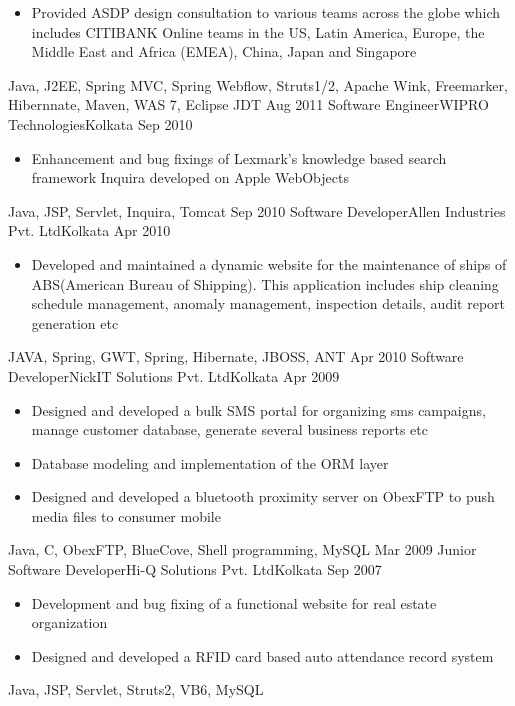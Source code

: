 \begin{experiences}
{\begin{itemize}
				\item Provided ASDP design consultation to various teams across the globe which includes CITIBANK Online teams in the US, Latin America, Europe, the Middle East and Africa (EMEA), China, Japan and Singapore
  				\end{itemize}
  }   
  {Java, J2EE, Spring MVC, Spring Webflow, Struts1/2, Apache Wink, Freemarker,
Hibernnate, Maven, WAS 7, Eclipse JDT}
 \emptySeparator   
  \experience
  {Aug 2011}    {Software Engineer}{WIPRO Technologies}{Kolkata}
  {Sep 2010}    {
                      \begin{itemize}
                        \item Enhancement and bug fixings of Lexmark’s knowledge based search framework Inquira developed on Apple WebObjects
                      \end{itemize}
                    }
                    {Java, JSP, Servlet, Inquira, Tomcat}    
  \emptySeparator            
  \experience
  {Sep 2010}   {Software Developer}{Allen Industries Pvt. Ltd}{Kolkata}
  {Apr 2010}   {
                      \begin{itemize}
                        \item Developed and maintained a dynamic website for the maintenance of ships of ABS(American Bureau of Shipping). This application includes ship cleaning schedule management, anomaly management, inspection details, audit report generation etc
                       \end{itemize}
                    }
                    {
                      JAVA, Spring, GWT, Spring, Hibernate, JBOSS, ANT
                    }
  \emptySeparator
  \experience
  {Apr 2010}  {Software Developer}{NickIT Solutions Pvt. Ltd}{Kolkata}
  {Apr 2009}   {
                      \begin{itemize}
                        \item Designed and developed a bulk SMS portal for organizing sms campaigns, manage customer database, generate several business reports etc
                        \item Database modeling and implementation of the ORM layer
                        \item Designed and developed a bluetooth proximity server on ObexFTP to push media files to consumer mobile
                      \end{itemize}
                  }
                  {Java, C, ObexFTP, BlueCove, Shell programming, MySQL}
 \emptySeparator
  \experience
  {Mar 2009}  {Junior Software Developer}{Hi-Q Solutions Pvt. Ltd}{Kolkata}
  {Sep 2007}   {
                      \begin{itemize}
                        \item Development and bug fixing of a functional website for real estate organization
                        \item Designed and developed a RFID card based auto attendance record system
                      \end{itemize}
                  }
                  {Java, JSP, Servlet, Struts2, VB6, MySQL}
\end{experiences}
